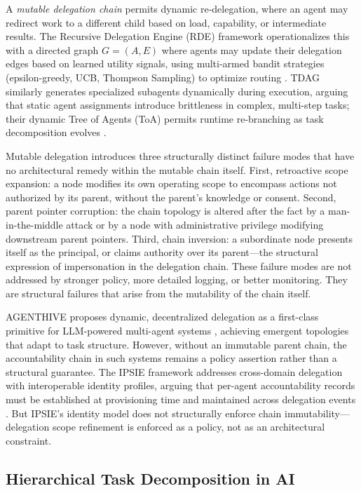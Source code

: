 A \emph{mutable delegation chain} permits dynamic re-delegation, where an agent may redirect work to a different child based on load, capability, or intermediate results. The Recursive Delegation Engine (RDE) framework operationalizes this with a directed graph $G = (A, E)$ where agents may update their delegation edges based on learned utility signals, using multi-armed bandit strategies (epsilon-greedy, UCB, Thompson Sampling) to optimize routing \cite{intelligent2025}. TDAG similarly generates specialized subagents dynamically during execution, arguing that static agent assignments introduce brittleness in complex, multi-step tasks; their dynamic Tree of Agents (ToA) permits runtime re-branching as task decomposition evolves \cite{tdag2024}.

Mutable delegation introduces three structurally distinct failure modes that have no architectural remedy within the mutable chain itself. First, retroactive scope expansion: a node modifies its own operating scope to encompass actions not authorized by its parent, without the parent's knowledge or consent. Second, parent pointer corruption: the chain topology is altered after the fact by a man-in-the-middle attack or by a node with administrative privilege modifying downstream parent pointers. Third, chain inversion: a subordinate node presents itself as the principal, or claims authority over its parent—the structural expression of impersonation in the delegation chain. These failure modes are not addressed by stronger policy, more detailed logging, or better monitoring. They are structural failures that arise from the mutability of the chain itself.

AGENTHIVE proposes dynamic, decentralized delegation as a first-class primitive for LLM-powered multi-agent systems \cite{agenthive2025}, achieving emergent topologies that adapt to task structure. However, without an immutable parent chain, the accountability chain in such systems remains a policy assertion rather than a structural guarantee. The IPSIE framework addresses cross-domain delegation with interoperable identity profiles, arguing that per-agent accountability records must be established at provisioning time and maintained across delegation events \cite{ipsiene2025}. But IPSIE's identity model does not structurally enforce chain immutability—delegation scope refinement is enforced as a policy, not as an architectural constraint.

\subsection{Hierarchical Task Decomposition in AI}

